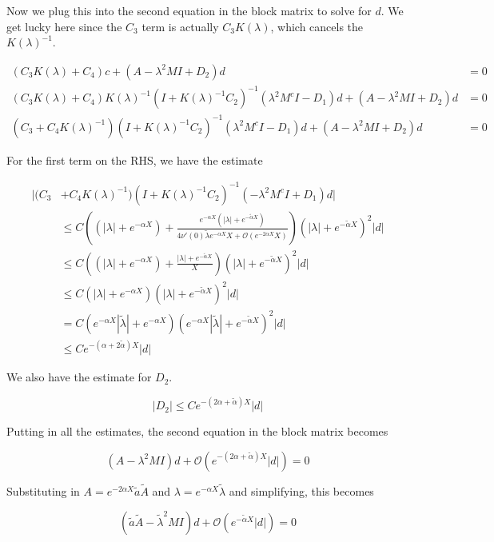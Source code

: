 \documentclass[12pt]{article}
\begin{document}
Now we plug this into the second equation in the block matrix to solve for $d$. We get lucky here since the $C_3$ term is actually $C_3 K(\lambda)$, which cancels the $K(\lambda)^{-1}$.

\begin{align*}
( C_3 K(\lambda) + C_4 )c + (A - \lambda^2 MI + D_2)d &= 0 \\
( C_3 K(\lambda) + C_4 )K(\lambda)^{-1} (I + K(\lambda)^{-1} C_2 )^{-1}(\lambda^2 M^c I - D_1)d  + (A - \lambda^2 MI + D_2)d &= 0 \\
( C_3 + C_4 K(\lambda)^{-1} ) (I + K(\lambda)^{-1} C_2 )^{-1}( \lambda^2 M^c I - D_1)d  + (A - \lambda^2 MI + D_2)d &= 0 
\end{align*}

For the first term on the RHS, we have the estimate

\begin{align*}
| ( C_3 &+ C_4 K(\lambda)^{-1} ) (I + K(\lambda)^{-1} C_2 )^{-1}( -\lambda^2 M^c I + D_1)d | \\
&\leq C \left( (|\lambda| + e^{-\alpha X}) + \frac{e^{-\alpha X}(|\lambda| + e^{-\tilde{\alpha} X})}{4 \nu'(0)\tilde{\lambda}e^{-\alpha X}X + \mathcal{O}(e^{-2 \alpha X}X)} \right) (|\lambda| + e^{-\tilde{\alpha} X})^2 |d| \\
&\leq C \left( (|\lambda| + e^{-\alpha X}) + \frac{|\lambda| + e^{-\tilde{\alpha} X}}{X} \right) (|\lambda| + e^{-\tilde{\alpha} X})^2 |d| \\
&\leq C (|\lambda| + e^{-\alpha X})(|\lambda| + e^{-\tilde{\alpha} X})^2 |d| \\
&= C (e^{-\alpha X} |\tilde{\lambda}| + e^{-\alpha X})(e^{-\alpha X} |\tilde{\lambda}| + e^{-\tilde{\alpha} X})^2 |d| \\
&\leq C e^{-(\alpha + 2 \tilde{\alpha})X} |d|
\end{align*}

We also have the estimate for $D_2$.

\[
|D_2| \leq C e^{-(2 \alpha + \tilde{\alpha})X} |d|
\]

Putting in all the estimates, the second equation in the block matrix becomes

\[
(A - \lambda^2 MI) d + \mathcal{O}(e^{-(2 \alpha + \tilde{\alpha})X} |d|) = 0
\]

Substituting in $A = e^{-2 \alpha X} \tilde{a} \tilde{A}$ and $\lambda = e^{-\alpha X} \tilde{\lambda}$ and simplifying, this becomes

\[
(\tilde{a} \tilde{A} - \tilde{\lambda}^2 M I) d + \mathcal{O}(e^{-\tilde{\alpha}X} |d|) = 0
\]
\end{document}
